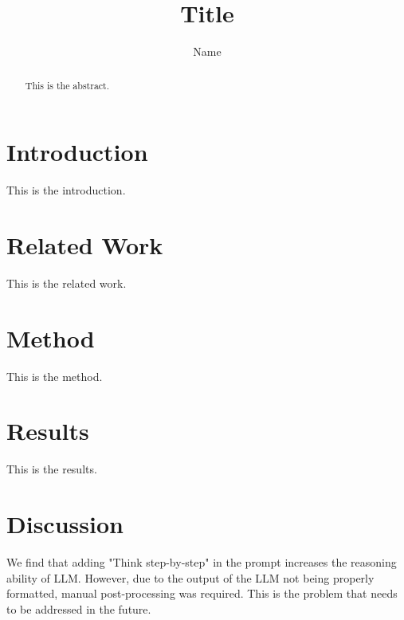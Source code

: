 \documentclass{article}
\title{Title}
\author{Name}
\begin{document}
\maketitle

\begin{abstract}
This is the abstract.
\end{abstract}

\section{Introduction}
This is the introduction.

\section{Related Work}
This is the related work.

\section{Method}
This is the method.

\section{Results}
This is the results.

\section{Discussion}
We find that adding "Think step-by-step" in the prompt increases the reasoning ability of LLM.
However, due to the output of the LLM not being properly formatted, manual post-processing was required. This is the problem that needs to be addressed in the future.
\end{document}
